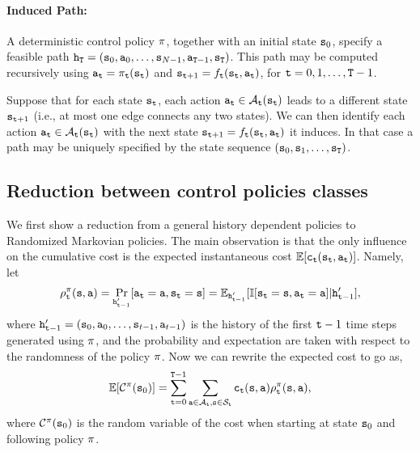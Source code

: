 \paragraph{Induced Path:}
A deterministic control policy $\pi $, together with an initial state
${{\tt s}_0}$, specify a feasible path ${{\tt h}_{\tt T}} =
({{\tt s}_0},{{\tt a}_0}, \ldots ,{{\tt s}_{N -
1}},{{\tt a}_{{\tt T} - 1}},{{\tt s}_{\tt T}})$. This path may be
computed recursively using ${{\tt a}_{{\tt t}}} = {\pi
_{{\tt t}}}({{\tt s}_{{\tt t}}})$ and ${{\tt s}_{{\tt t} + 1}} =
{f_{{\tt t}}}({{\tt s}_{{\tt t}}},{{\tt a}_{{\tt t}}})$, for ${\tt t} =
0,1, \ldots ,{\tt T} - 1$.

\begin{remark}
Suppose that for each state ${{\tt s}_{{\tt t}}}$, each action
${{\tt a}_{{\tt t}}} \in {\mathcal{A}_{{\tt t}}}({{\tt s}_{{\tt t}}})$
leads to a different state ${{\tt s}_{{\tt t} + 1}}$ (i.e., at most
one edge connects any two states). We can then identify each action
${{\tt a}_{{\tt t}}} \in {\mathcal{A}_{{\tt t}}}({\tt s}_{{\tt t}})$ with
the next state ${{\tt s}_{{\tt t} + 1}} =
{f_{{\tt t}}}({\tt s}_{{\tt t}},{{\tt a}_{{\tt t}}})$ it induces. In
that case a path may be uniquely specified by the state sequence
$({{\tt s}_0},{{\tt s}_1}, \ldots ,{{\tt s}_{\tt T}})$.
\end{remark}


\subsection{Reduction between control policies classes}\label{chp2:sec:FH-HS-MD}

We first show a reduction from a general history dependent policies
to Randomized Markovian policies. The main observation is that the
only influence on the cumulative cost is the expected instantaneous
cost $\mathbb{E}[{\tt c}_{\tt t}({\tt s}_{\tt t},{\tt a}_{\tt t})]$. Namely, let
\[
\rho^\pi_{\tt t}({\tt s},{\tt a})=\Pr_{{\tt h}'_{{\tt t}-1}}
[{\tt a}_{\tt t}={\tt a},{\tt s}_{\tt t}={\tt s}]=\mathbb{E}_{{\tt h}'_{{\tt t}-1}}[\mathbb{I}
[{\tt s}_{\tt t}={\tt s},{\tt a}_{\tt t}={\tt a}]| {\tt h}'_{{\tt t}-1}],
\]
where
${\tt h}'_{{\tt t}-1}=({\tt s}_0,{\tt a}_0,\ldots,{\tt s}_{t-1},{\tt a}_{t-1})$
is the history of the first ${\tt t}-1$ time steps generated using
$\pi$, and the probability and expectation are taken with
respect to the randomness of the policy $\pi$. Now we can
rewrite the expected cost to go as,
\[
\mathbb{E}[\mathcal{C}^\pi({\tt s}_0)]=\sum_{{\tt t}=0}^{{\tt T}-1}
\sum_{{\tt a}\in \mathcal{A}_{\tt t},{\tt s}\in \mathcal{S}_{\tt t}}
{\tt c}_{\tt t}({\tt s},{\tt a})\rho^\pi_{\tt t}({\tt s},{\tt a}),
\]
where $\mathcal{C}^\pi({\tt s}_0)$ is the random variable of the cost
when starting at state ${\tt s}_0$ and following policy $\pi$.

